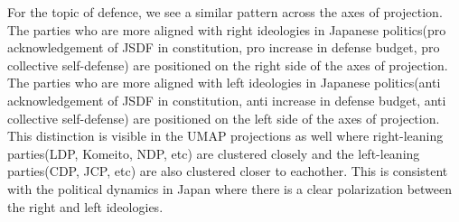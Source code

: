 \documentclass[final,5p,times,twocolumn,authoryear]{elsarticle}
\begin{document}
For the topic of defence, we see a similar pattern across the axes of projection. The parties who are more aligned with right ideologies in Japanese politics(pro acknowledgement of JSDF in constitution, pro increase in defense budget, pro collective self-defense) are positioned on the right side of the axes of projection. The parties who are more aligned with left ideologies in Japanese politics(anti acknowledgement of JSDF in constitution, anti increase in defense budget, anti collective self-defense) are positioned on the left side of the axes of projection. This distinction is visible in the UMAP projections as well where right-leaning parties(LDP, Komeito, NDP, etc) are clustered closely and the left-leaning parties(CDP, JCP, etc) are also clustered closer to eachother. This is consistent with the political dynamics in Japan where there is a clear polarization between the right and left ideologies. 
\end{document}
